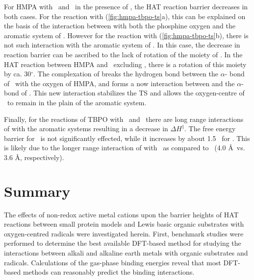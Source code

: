 For HMPA with \cumo\ and \bno\ in the presence of , the HAT reaction barrier decreases in both cases. For the reaction with \cumo (\ref{fig:hmpa-tbpo-ts}a), this can be explained on the basis of the interaction between  with both the phosphine oxygen and the aromatic system of \cumo. However for the reaction with \bno (\ref{fig:hmpa-tbpo-ts}b), there is not such interaction with the aromatic system of \bno. In this case, the decrease in reaction barrier can be ascribed to the lack of rotation of the  moiety of \bno. In the HAT reaction between HMPA and \bno\ excluding , there is a rotation of this moiety by ca. 30$^\circ$. The complexation of  breaks the hydrogen bond between the $\alpha$- bond of \bno\ with the oxygen of HMPA, and forms a now interaction between  and the $\alpha$- bond of \bno. This new interaction stabilizes the TS and allows the oxygen-centre of \bno\ to remain in the plain of the aromatic system.

Finally, for the reactions of TBPO with \cumo\ and \bno\ there are long range interactions of  with the aromatic systems resulting in a decrease in $\Delta H^\ddagger$. The free energy barrier for \cumo\ is not significantly effected, while it increases by about 1.5 \kcalmol\ for \bno. This is likely due to the longer range interaction of  with \cumo\ as compared to \bno\ (4.0 \AA\ vs. 3.6 \AA, respectively).

\section{Summary}

The effects of non-redox active metal cations upon the barrier heights of HAT reactions between small protein models and Lewis basic organic substrates with oxygen-centred radicals were investigated herein. First, benchmark studies were performed to determine the best available DFT-based method for studying the interactions between alkali and alkaline earth metals with organic substrates and radicals. Calculations of the gas-phase binding energies reveal that most DFT-based methods can reasonably predict the binding interactions.

